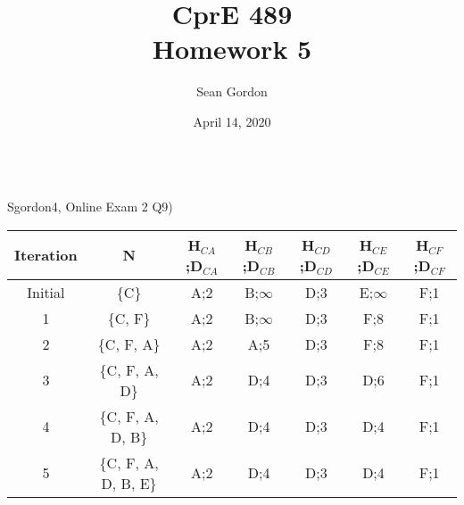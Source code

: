 \documentclass[12pt]{article}
\title{CprE 489\\Homework 5}
\author{Sean Gordon}
\date{April 14, 2020}
\begin{document}
\maketitle


\noindent\hrulefill \\


\noindent Sgordon4, Online Exam 2 Q9)
\begin{table}[h!]
\centering
\begin{tabular}{c|c|c|c|c|c|c}
\bottomrule
Iteration & N & H$_{CA}$;D$_{CA}$ & H$_{CB}$;D$_{CB}$ & H$_{CD}$;D$_{CD}$ & H$_{CE}$;D$_{CE}$ & H$_{CF}$;D$_{CF}$\\\toprule
Initial & \{C\} & A;2 & B;$\infty$ & D;3 & E;$\infty$ & F;1 \\
1 & \{C, F\} & A;2 & B;$\infty$ & D;3 & F;8 & F;1 \\
2 & \{C, F, A\} & A;2 & A;5 & D;3 & F;8 & F;1 \\
3 & \{C, F, A, D\} & A;2 & D;4 & D;3 & D;6 & F;1 \\
4 & \{C, F, A, D, B\} & A;2 & D;4 & D;3 & D;4 & F;1 \\
5 & \{C, F, A, D, B, E\} & A;2 & D;4 & D;3 & D;4 & F;1 \\\bottomrule
\end{tabular}
\end{table}\\
\end{document}

